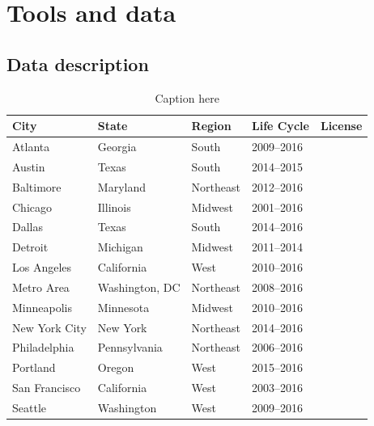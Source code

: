 \section{Tools and data}

\subsection{Data description}

\begin{table}[H]
	\centering
	\label{tab:city-list}
	\begin{tabular}{l l l l l}
	\toprule
	\toprule
	City          & State          & Region    & Life Cycle            & License \\
	\midrule
	Atlanta       & Georgia        & South     & \numrange{2009}{2016} &         \\
	Austin        & Texas          & South     & \numrange{2014}{2015} &         \\
	Baltimore     & Maryland       & Northeast & \numrange{2012}{2016} &         \\
	Chicago       & Illinois       & Midwest   & \numrange{2001}{2016} &         \\
	Dallas        & Texas          & South     & \numrange{2014}{2016} &         \\
	Detroit       & Michigan       & Midwest   & \numrange{2011}{2014} &         \\
	Los Angeles   & California     & West      & \numrange{2010}{2016} &         \\
	Metro Area    & Washington, DC & Northeast & \numrange{2008}{2016} &         \\
	Minneapolis   & Minnesota      & Midwest   & \numrange{2010}{2016} &         \\
	New York City & New York       & Northeast & \numrange{2014}{2016} &         \\
	Philadelphia  & Pennsylvania   & Northeast & \numrange{2006}{2016} &         \\
	Portland      & Oregon         & West      & \numrange{2015}{2016} &         \\
	San Francisco & California     & West      & \numrange{2003}{2016} &         \\
	Seattle       & Washington     & West      & \numrange{2009}{2016} & \\
	\bottomrule
	\end{tabular}
	\caption{Caption here}
\end{table}

